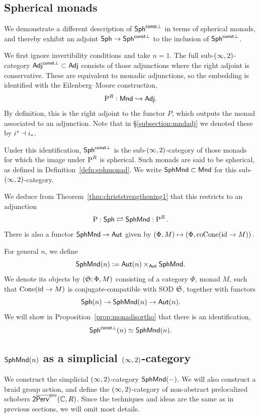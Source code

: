 \subsection{Spherical monads}\label{subsection:quotientismonad}
We demonstrate a different description of $\mathsf{Sph}^{\mathsf{const}\perp}$ in terms of spherical monads, and thereby exhibit an adjoint $\mathsf{Sph}\to\mathsf{Sph}^{\mathsf{const}\perp}$ to the inclusion of $\mathsf{Sph}^{\mathsf{const}\perp}$.

We first ignore invertibility conditions and take $n=1$. The full sub-$(\infty,2)$-category $\mathsf{Adj}^{\mathsf{const}\perp}\subset \mathsf{Adj}$ consists of those adjunctions where the right adjoint is conservative. These are equivalent to monadic adjunctions, so the embedding is identified with the Eilenberg--Moore construction,
\[\operatorname{P}^R:\mathsf{Mnd}\hookrightarrow \mathsf{Adj}.\]
By definition, this is the right adjoint to the functor $P$, which outputs the monad associated to an adjunction. Note that in \S\ref{subsection:mndadj} we denoted these by $i^*\dashv i_*$.

Under this identification, $\mathsf{Sph}^{\mathsf{const}\perp}$ is the sub-$(\infty,2)$-category of those monads for which the image under $\operatorname{P}^R$ is spherical. Such monads are said to be spherical, as defined in Definition~\ref{defn:sphmonad}. We write $\mathsf{SphMnd}\subset \mathsf{Mnd}$ for this sub-$(\infty,2)$-category.

We deduce from Theorem~\ref{thm:christstrengthening1} that this restricts to an adjunction
\[\operatorname{P}:\mathsf{Sph}\rightleftarrows \mathsf{SphMnd}:\operatorname{P}^R.\]
There is also a functor $\mathsf{SphMnd}\to\mathsf{Aut}$ given by $(\Phi,M)\mapsto (\Phi,\operatorname{coCone}(\operatorname{id}\to M))$.

For general $n$, we define
\[\mathsf{SphMnd}(n) := \mathsf{Aut}(n)\times_{\mathsf{Aut}}\mathsf{SphMnd}.\]
We denote its objects by $(\mathfrak{S};\Phi,M)$ consisting of a category $\Phi$, monad $M$, such that $\operatorname{Cone}(\operatorname{id}\to M)$ is conjugate-compatible with SOD $\mathfrak{S}$, together with functors
\[\mathsf{Sph}(n)\to\mathsf{SphMnd}(n)\to\mathsf{Aut}(n).\]
We will show in Proposition~\ref{prop:monadisortho} that there is an identification,
\[\mathsf{Sph}^{\mathsf{const}\perp}(n)\simeq \mathsf{SphMnd}(n).\]

\subsection{\texorpdfstring{$\mathsf{SphMnd}(n)$}{SphMnd(n)} as a simplicial \texorpdfstring{$(\infty,2)$}{2}-category}\label{subsection:twocatsphmnd}
We construct the simplicial $(\infty,2)$-category $\mathsf{SphMnd}(-)$. We will also construct a braid group action, and define the $(\infty,2)$-category of non-abstract prelocalized schobers $\mathsf{2}\overline{\mathsf{Perv}}^{\operatorname{pre}}(\mathbb{C},R)$. Since the techniques and ideas are the same as in previous sections, we will omit most details.

